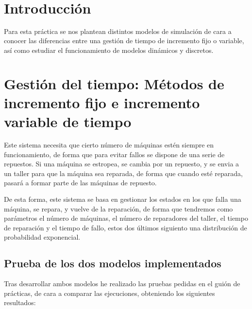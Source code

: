 \documentclass[12pt, spanish]{article}
\makeatletter
\let\thedate\@date
\makeatother
\begin{document}
\begin{titlepage}
    {\large \thedate}\\[0.5cm]
    {\doclicenseThis}

    \vfill

\end{titlepage}


\tableofcontents
\pagebreak



\section*{Introducción}

Para esta práctica se nos plantean distintos modelos de simulación de cara a conocer las diferencias entre una gestión de tiempo de incremento fijo o variable, así como estudiar el funcionamiento de modelos dinámicos y discretos.

\section{Gestión del tiempo: Métodos de incremento fijo e incremento variable de tiempo}

Este sistema necesita que cierto número de máquinas estén siempre en funcionamiento, de forma que para evitar fallos se dispone de una serie de repuestos. Si una máquina se estropea, se cambia por un repuesto, y se envia a un taller para que la máquina sea reparada, de forma que cuando esté reparada, pasará a formar parte de las máquinas de repuesto.

De esta forma, este sistema se basa en gestionar los estados en los que falla una máquina, se repara, y vuelve de la reparación, de forma que tendremos como parámetros el número de máquinas, el número de reparadores del taller, el tiempo de reparación y el tiempo de fallo, estos dos últimos siguiento una distribución de probabilidad exponencial.


\subsection{Prueba de los dos modelos implementados}

Tras desarrollar ambos modelos he realizado las pruebas pedidas en el guión de prácticas, de cara a comparar las ejecuciones, obteniendo los siguientes resultados:
\end{document}
